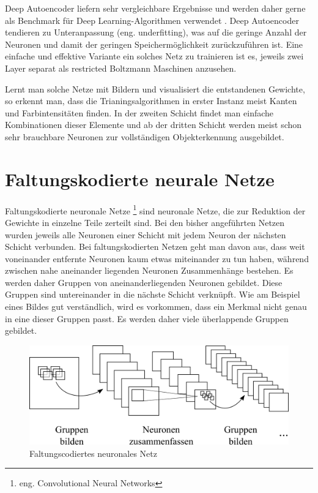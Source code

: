 Deep Autoencoder liefern sehr vergleichbare Ergebnisse und werden daher gerne als Benchmark für Deep Learning-Algorithmen verwendet \citep{AutoencoderBenchmark}. Deep Autoencoder tendieren zu Unteranpassung (eng. underfitting), was auf die geringe Anzahl der Neuronen und damit der geringen Speichermöglichkeit zurückzuführen ist. Eine einfache und effektive Variante ein solches Netz zu trainieren ist es, jeweils zwei Layer separat als restricted Boltzmann Maschinen anzusehen.

Lernt man solche Netze mit Bildern und visualisiert die entstandenen Gewichte, so erkennt man, dass die Trianingsalgorithmen in erster Instanz meist Kanten und Farbintensitäten finden. In der zweiten Schicht findet man einfache Kombinationen dieser Elemente und ab der dritten Schicht werden meist schon sehr brauchbare Neuronen zur vollständigen Objekterkennung ausgebildet.

\section{Faltungskodierte neurale Netze}

Faltungskodierte neuronale Netze \footnote{eng. Convolutional Neural Networks} sind neuronale Netze, die zur Reduktion der Gewichte in einzelne Teile zerteilt sind. Bei den bisher angeführten Netzen wurden jeweils alle Neuronen einer Schicht mit jedem Neuron der nächsten Schicht verbunden. Bei faltungskodierten Netzen geht man davon aus, dass weit voneinander entfernte Neuronen kaum etwas miteinander zu tun haben, während zwischen nahe aneinander liegenden Neuronen Zusammenhänge bestehen. Es werden daher Gruppen von aneinanderliegenden Neuronen gebildet. Diese Gruppen sind untereinander in die nächste Schicht verknüpft. Wie am Beispiel eines Bildes gut verständlich, wird es vorkommen, dass ein Merkmal nicht genau in eine dieser Gruppen passt. Es werden daher viele überlappende Gruppen gebildet.

\begin{figure}
	\centering
	\includegraphics[scale=1]{images/convolution.png}
	\caption{Faltungscodiertes neuronales Netz}
	\label{fig:convolution}
\end{figure}

